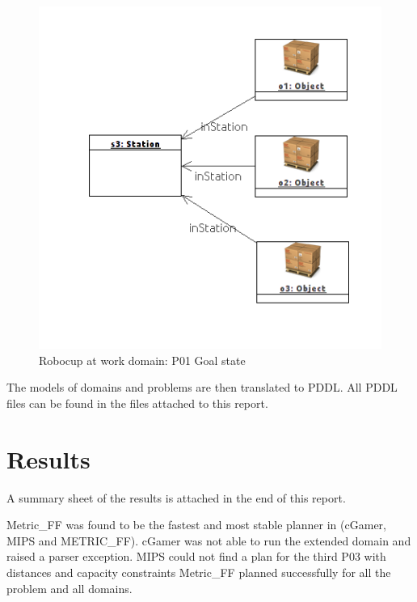\documentclass{article}
\begin{document}
\begin{figure}[h] %
	\centering
	\includegraphics[width=8 cm]{figures/p01_goal.png} 
	\caption{Robocup at work domain: P01 Goal state}
	\label{fig:goal}
\end{figure}

The models of domains and problems are then translated to PDDL. All PDDL files can be found in the files attached to this report.

\newpage
\section{Results}
A summary sheet of the results is attached in the end of this report. 

Metric\_FF was found to be the fastest and most stable planner in (cGamer, MIPS and METRIC\_FF). cGamer was not able to run the extended domain and raised a parser exception. MIPS could not find a plan for the third P03 with distances and capacity constraints Metric\_FF planned successfully for all the problem and all domains.

\newpage


\end{document}
